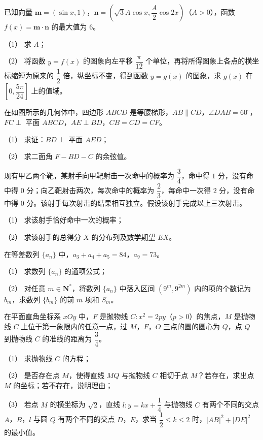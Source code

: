 \begin{question}
已知向量 $\boldsymbol m=(\sin x,1)$，$\boldsymbol n=\left(\sqrt3A\cos x,\dfrac A2\cos2x\right)$（$A>0$），函数 $f(x)=\boldsymbol m\cdot\boldsymbol n$ 的最大值为 $6$。

（1） 求 $A$；

（2） 将函数 $y=f(x)$ 的图象向左平移 $\dfrac\pi{12}$ 个单位，再将所得图象上各点的横坐标缩短为原来的 $\dfrac12$ 倍，纵坐标不变，得到函数 $y=g(x)$ 的图象，求 $g(x)$ 在 $\left[0,\dfrac{5\pi}{24}\right]$ 上的值域。

\Needspace{0.4\textheight}
\end{question}
\begin{question}
在如图所示的几何体中，四边形 $ABCD$ 是等腰梯形，$AB\parallel CD$，$\angle DAB=60^\circ$，$FC\perp$ 平面 $ABCD$，$AE\perp BD$，$CB=CD=CF$。

（1） 求证：$BD\perp$ 平面 $AED$；

（2） 求二面角 $F-BD-C$ 的余弦值。
\nopagebreak[4]
\begin{center}\end{center}
\nopagebreak[4]
\end{question}
\begin{question}
现有甲乙两个靶，某射手向甲靶射击一次命中的概率为 $\dfrac34$，命中得 $1$ 分，没有命中得 $0$ 分；向乙靶射击两次，每次命中的概率为 $\dfrac23$，每命中一次得 $2$ 分，没有命中得 $0$ 分。该射手每次射击的结果相互独立。假设该射手完成以上三次射击。

（1） 求该射手恰好命中一次的概率；

（2） 求该射手的总得分 $X$ 的分布列及数学期望 $EX$。

\end{question}
\begin{question}
在等差数列 $\{a_n\}$ 中，$a_3+a_4+a_5=84$，$a_9=73$。

（1） 求数列 $\{a_n\}$ 的通项公式；

（2） 对任意 $m\in\mathbf N^*$，将数列 $\{a_n\}$ 中落入区间 $(9^m,9^{2m})$ 内的项的个数记为 $b_m$，求数列 $\{b_m\}$ 的前 $m$ 项和 $S_m$。

\end{question}
\begin{question}
在平面直角坐标系 $xOy$ 中，$F$ 是抛物线 $C:x^2=2py$（$p>0$）的焦点，$M$ 是抛物线 $C$ 上位于第一象限内的任意一点，过 $M$，$F$，$O$ 三点的圆的圆心为 $Q$，点 $Q$ 到抛物线 $C$ 的准线的距离为 $\dfrac34$。

（1） 求抛物线 $C$ 的方程；

（2） 是否存在点 $M$，使得直线 $MQ$ 与抛物线 $C$ 相切于点 $M$？若存在，求出点 $M$ 的坐标；若不存在，说明理由；

（3） 若点 $M$ 的横坐标为 $\sqrt2$，直线 $l:y=kx+\dfrac14$ 与抛物线 $C$ 有两个不同的交点 $A$，$B$，$l$ 与圆 $Q$ 有两个不同的交点 $D$，$E$，求当 $\dfrac12\leqslant k\leqslant2$ 时，$|AB|^2+|DE|^2$ 的最小值。

\end{question}
